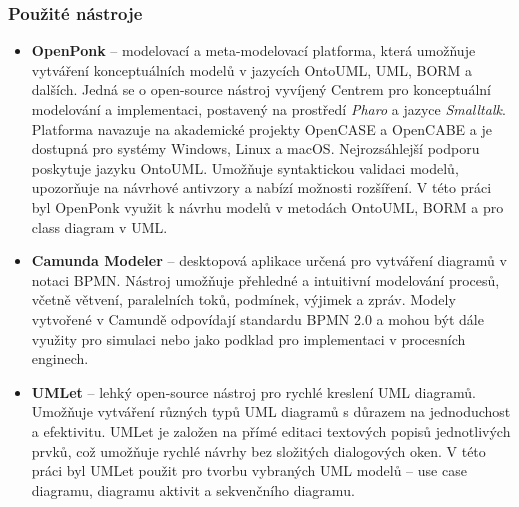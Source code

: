 \subsubsection{Použité nástroje}
\label{sec:použité-nástroje}
\begin{itemize}
  \item \textbf{OpenPonk} – modelovací a meta-modelovací platforma, která umožňuje vytváření konceptuálních modelů v jazycích OntoUML, UML, BORM a dalších. Jedná se o open-source nástroj vyvíjený Centrem pro konceptuální modelování a implementaci, postavený na prostředí \textit{Pharo} a jazyce \textit{Smalltalk}. Platforma navazuje na akademické projekty OpenCASE a OpenCABE a je dostupná pro systémy Windows, Linux a macOS. Nejrozsáhlejší podporu poskytuje jazyku OntoUML. Umožňuje syntaktickou validaci modelů, upozorňuje na návrhové antivzory a nabízí možnosti rozšíření. V této práci byl OpenPonk využit k návrhu modelů v metodách OntoUML, BORM a pro class diagram v UML.
  
  \item \textbf{Camunda Modeler} – desktopová aplikace určená pro vytváření diagramů v notaci BPMN. Nástroj umožňuje přehledné a intuitivní modelování procesů, včetně větvení, paralelních toků, podmínek, výjimek a zpráv. Modely vytvořené v Camundě odpovídají standardu BPMN 2.0 a mohou být dále využity pro simulaci nebo jako podklad pro implementaci v procesních enginech.
  
  \item \textbf{UMLet} – lehký open-source nástroj pro rychlé kreslení UML diagramů. Umožňuje vytváření různých typů UML diagramů s důrazem na jednoduchost a efektivitu. UMLet je založen na přímé editaci textových popisů jednotlivých prvků, což umožňuje rychlé návrhy bez složitých dialogových oken. V této práci byl UMLet použit pro tvorbu vybraných UML modelů – use case diagramu, diagramu aktivit a sekvenčního diagramu.
  

\end{itemize}
